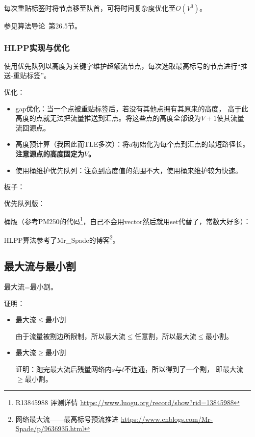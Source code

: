 每次重贴标签时将节点移至队首，可将时间复杂度优化至$O(V^3)$。

参见算法导论\cite{ITA3}~第26.5节。

\subsubsection{HLPP实现与优化}

使用优先队列以高度为关键字维护超额流节点，每次选取最高标号的节点进行``推送-重贴标签''。

优化：
\begin{itemize}
	\item gap优化：当一个点被重贴标签后，若没有其他点拥有其原来的高度，
	高于此高度的点就无法把流量推送到汇点。将这些点的高度全部设为$V+1$使其流量
	流回源点。
	\item 高度预计算（我因此而TLE多次）：将$d$初始化为每个点到汇点的最短路径长。
	{\bfseries 注意源点的高度固定为$V$。}
	\item 使用桶维护优先队列：注意到高度值的范围不大，使用桶来维护较为快速。
\end{itemize}

板子：

优先队列版：


桶版（参考PM250的代码\footnote{
	R13845988 评测详情
	\url{https://www.luogu.org/record/show?rid=13845988}
}，自己不会用vector然后就用set代替了，常数大好多）：


HLPP算法参考了Mr\_Spade的博客\footnote{
	网络最大流——最高标号预流推进
	\url{https://www.cnblogs.com/Mr-Spade/p/9636935.html}
}。

\subsection{最大流与最小割}

\begin{theorem}\label{MFMCT}
	最大流=最小割。
\end{theorem}

证明：
\begin{itemize}
	\item
	\begin{lemma}\label{MCA}
		最大流$\leq$最小割
	\end{lemma}
	由于流量被割边所限制，所以最大流$\leq$任意割，所以最大流$\leq$最小割。
	\item
	\begin{lemma}\label{MCB}
		最大流$\geq$最小割
	\end{lemma}
	证明：跑完最大流后残量网络内$s$与$t$不连通，所以得到了一个割，
	即最大流$\geq$最小割。
\end{itemize}

